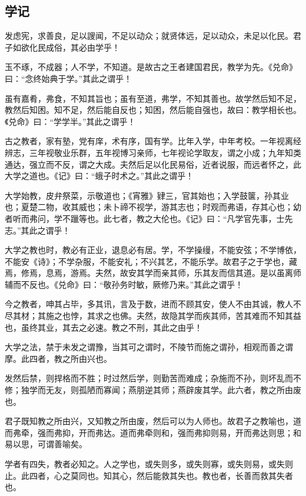 \documentclass[]{article}
\begin{document}
\hypertarget{header-n524}{%
\subsection{学记}\label{header-n524}}

发虑宪，求善良，足以謏闻，不足以动众；就贤体远，足以动众，未足以化民。君子如欲化民成俗，其必由学乎！

玉不琢，不成器；人不学，不知道。是故古之王者建国君民，教学为先。《兑命》曰：``念终始典于学。''其此之谓乎！

虽有嘉肴，弗食，不知其旨也；虽有至道，弗学，不知其善也。故学然后知不足，教然后知困。知不足，然后能自反也；知困，然后能自强也，故曰：教学相长也。《兑命》曰：``学学半。''其此之谓乎！

古之教者，家有塾，党有庠，术有序，国有学。比年入学，中年考校。一年视离经辨志，三年视敬业乐群，五年视博习亲师，七年视论学取友，谓之小成；九年知类通达，强立而不反，谓之大成。夫然后足以化民易俗，近者说服，而远者怀之，此大学之道也。《记》曰：``蛾子时术之。''其此之谓乎！

大学始教，皮弁祭菜，示敬道也；《宵雅》肄三，官其始也；入学鼓箧，孙其业也；夏楚二物，收其威也；未卜禘不视学，游其志也；时观而弗语，存其心也；幼者听而弗问，学不躐等也。此七者，教之大伦也。《记》曰：``凡学官先事，士先志。''其此之谓乎！

大学之教也时，教必有正业，退息必有居。学，不学操缦，不能安弦；不学博依，不能安《诗》；不学杂服，不能安礼；不兴其艺，不能乐学。故君子之于学也，藏焉，修焉，息焉，游焉。夫然，故安其学而亲其师，乐其友而信其道。是以虽离师辅而不反也。《兑命》曰：``敬孙务时敏，厥修乃来。''其此之谓乎！

今之教者，呻其占毕，多其讯，言及于数，进而不顾其安，使人不由其诚，教人不尽其材；其施之也悖，其求之也佛。夫然，故隐其学而疾其师，苦其难而不知其益也，虽终其业，其去之必速。教之不刑，其此之由乎！

大学之法，禁于未发之谓豫，当其可之谓时，不陵节而施之谓孙，相观而善之谓摩。此四者，教之所由兴也。

发然后禁，则捍格而不胜；时过然后学，则勤苦而难成；杂施而不孙，则坏乱而不修；独学而无友，则孤陋而寡闻；燕朋逆其师；燕辟废其学。此六者，教之所由废也。

君子既知教之所由兴，又知教之所由废，然后可以为人师也。故君子之教喻也，道而弗牵，强而弗抑，开而弗达。道而弗牵则和，强而弗抑则易，开而弗达则思；和易以思，可谓善喻矣。

学者有四失，教者必知之。人之学也，或失则多，或失则寡，或失则易，或失则止。此四者，心之莫同也。知其心，然后能救其失也。教也者，长善而救其失者也。
\end{document}
